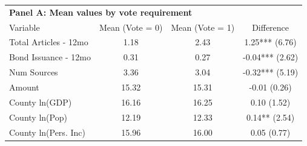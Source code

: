 \begin{table}[ht]
\centering
\begin{tabular*}{\textwidth}{@{\extracolsep{\fill}}lccc}
\multicolumn{4}{l}{\textbf{Panel A: Mean values by vote requirement}}\\

\addlinespace
  \hline
Variable & Mean (Vote = 0) & Mean (Vote = 1) & Difference \\ 
  \hline
Total Articles - 12mo & 1.18 & 2.43 & 1.25*** (6.76) \\ 
  Bond Issuance - 12mo & 0.31 & 0.27 & -0.04*** (2.62) \\ 
  Num Sources & 3.36 & 3.04 & -0.32*** (5.19) \\ 
  Amount & 15.32 & 15.31 & -0.01 (0.26) \\ 
  County ln(GDP) & 16.16 & 16.25 & 0.10 (1.52) \\ 
  County ln(Pop) & 12.19 & 12.33 & 0.14** (2.54) \\ 
  County ln(Pers. Inc) & 15.96 & 16.00 & 0.05 (0.77) \\ 
   \hline
\end{tabular*}
\end{table}
